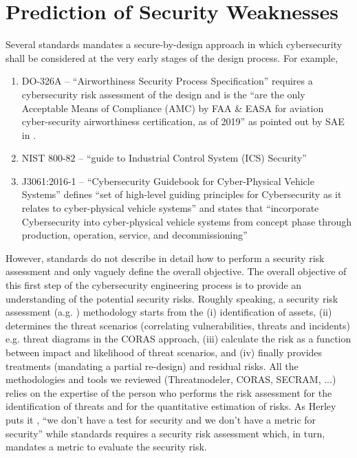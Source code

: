 \documentclass[conference]{IEEEtran}
\begin{document}
\section{Prediction of Security Weaknesses}\label{sec:theory}
Several standards mandates a secure-by-design approach in which cybersecurity
shall be considered at the very early stages of the design process.  For
example,
\begin{enumerate}[noitemsep]
	\item DO-326A -- ``Airworthiness Security Process Specification''
		requires a cybersecurity risk assessment of the design and is
		the ``are the only Acceptable Means of Compliance (AMC) by FAA
		\& EASA for aviation cyber-security airworthiness certification,
		as of 2019'' as pointed out by SAE in \autocite{SAE2019DO326A}.
	\item NIST 800-82 \autocite{Stouffer2011guide} -- ``guide to Industrial
		Control System (ICS) Security''
	\item J3061:2016-1 \autocite{SAE2016J3061} -- ``Cybersecurity Guidebook
		for Cyber-Physical Vehicle Systems'' defines ``set of
		high-level guiding principles for Cybersecurity as it relates
		to cyber-physical vehicle systems'' and states that
		``incorporate Cybersecurity into cyber-physical vehicle systems
		from concept phase through production, operation, service, and
		decommissioning''
\end{enumerate}
However, standards do not describe in detail how to perform a security risk 
assessment and only vaguely define the overall objective. The overall
objective of this first step of the cybersecurity engineering process
is to provide an understanding of the potential security risks.
Roughly speaking, a security risk assessment (a.g. \autocite{coras,secram}) 
methodology starts from the (i) identification of assets, (ii) determines
the threat scenarios (correlating vulnerabilities, threats and incidents) e.g. 
threat diagrams in the CORAS approach, (iii) calculate the risk as a function
between impact and likelihood of threat scenarios, and (iv) finally provides
treatments (mandating a partial re-design) and residual risks.
All the methodologies and tools we reviewed (Threatmodeler, CORAS, SECRAM, ...)
relies on the expertise of the person who performs the risk assessment for
the identification of threats and for the quantitative estimation of risks.
As Herley puts it \autocite{cite}, ``we don't have a test for security and
we don't have a metric for security'' while standards requires a security risk assessment
which, in turn, mandates a metric to evaluate the security risk. 
\end{document}
